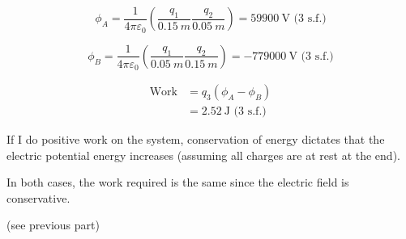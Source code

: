 \begin{solution}
    \begin{subsolution}
        \[\phi_A = \frac{1}{4 \pi \varepsilon_0} \left(\frac{q_1}{\qty{0.15}{m}}\frac{q_2}{\qty{0.05}{m}}\right) = \boxed{\qty{59900}{\V}}\text{ (3 s.f.)}\]
    \end{subsolution}
    \begin{subsolution}
        \[\phi_B = \frac{1}{4 \pi \varepsilon_0} \left(\frac{q_1}{\qty{0.05}{m}}\frac{q_2}{\qty{0.15}{m}}\right) = \boxed{\qty{-779000}{\V}}\text{ (3 s.f.)}\]
    \end{subsolution}
    \begin{subsolution}
        \begin{align}
            \text{Work} &= q_3 \left(\phi_A - \phi_B\right) \\
                        & = \boxed{\qty{2.52}{\J}}\text{ (3 s.f.)}
        \end{align}
    \end{subsolution}
    \begin{subsolution}
        If I do positive work on the system, conservation of energy dictates that the electric potential energy increases (assuming all charges are at rest at the end).
    \end{subsolution}
    \begin{subsolution}
    In both cases, the work required is the same since the electric field is conservative.
    \end{subsolution}
    \begin{subsolution}
    (see previous part)
    \end{subsolution}
\end{solution}

